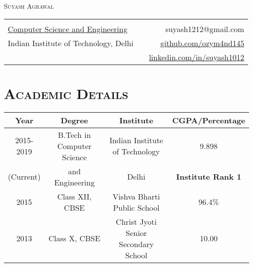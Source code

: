 \documentclass{article}
\newcommand{\tmpsection}[1]{}
\let\tmpsection=\section
\renewcommand{\section}[1]{\tmpsection*{\textsc{#1}}}
\begin{document}

\begin{center}
 {\Large \textsc{Suyash Agrawal} }\\ 
\begin{tabular}{ l p{8cm} r }
    & &   \\
  \href{http://www.cse.iitd.ernet.in/}{Computer Science and Engineering} & & suyash1212@gmail.com \\
  Indian Institute of Technology, Delhi
  & & \href{https://github.com/ozym4nd145/}{github.com/ozym4nd145} \\
  & & \href{https://www.linkedin.com/in/suyash1012}{linkedin.com/in/suyash1012}\\
\end{tabular}
\end{center}


\section{Academic Details}

\begin{center}
\begin{tabular}{ |c | c | c | c |}
\hline
Year & Degree & Institute & CGPA/Percentage \\ 
\hline
2015-2019 & B.Tech in Computer Science & Indian Institute of Technology & 9.898 \\ 
(Current) & and Engineering & Delhi & \textbf{Institute Rank 1}\\
\hline


2015 & Class XII, CBSE & Vishva Bharti Public School & 96.4\% \\ 

\hline
2013 & Class X, CBSE & Christ Jyoti Senior Secondary School & 10.00 \\  \hline
\end{tabular}
\end{center}
\end{document}
